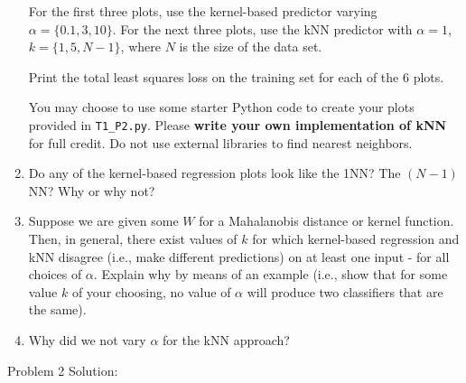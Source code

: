 \documentclass[submit]{harvardml}
\begin{document}
\begin{problem}
\begin{enumerate}
  For the first three plots, use the kernel-based predictor varying
  $\alpha = \{0.1,3,10\}$.  For the next three plots, use the kNN
  predictor with $\alpha = 1$, $k=\{1,5,N-1\}$, where $N$ is the size
  of the data set.

  Print the total least squares loss on the training set for each of
  the 6 plots.

  You may choose to use some starter Python code to create your plots
  provided in \verb|T1_P2.py|.  Please \textbf{write your own
    implementation of kNN} for full credit.  Do not use external
  libraries to find nearest neighbors.

\item Do any of the kernel-based regression plots look like the 1NN?
  The $(N-1)$NN?  Why or why not?

\item Suppose we are given some $W$ for a Mahalanobis distance or
  kernel function.  Then, in general, there exist values of $k$ for which
  kernel-based regression and kNN disagree (i.e., make different predictions)
  on at least one input - for all choices of $\alpha$. Explain why by means of
  an example (i.e., show that for some value $k$ of your choosing,
  no value of $\alpha$ will produce two classifiers that are the same).

\item Why did we not vary $\alpha$ for the kNN approach?

\end{enumerate}

\end{problem}

\newpage

Problem 2 Solution:
\end{document}
